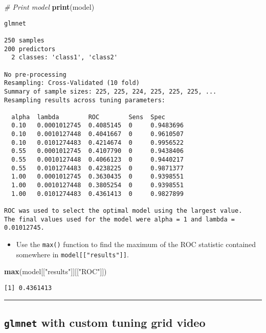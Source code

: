 \documentclass[]{book}
\newenvironment{Shaded}{\begin{snugshade}}{\end{snugshade}}
\newcommand{\KeywordTok}[1]{\textcolor[rgb]{0.13,0.29,0.53}{\textbf{#1}}}
\newcommand{\StringTok}[1]{\textcolor[rgb]{0.31,0.60,0.02}{#1}}
\newcommand{\CommentTok}[1]{\textcolor[rgb]{0.56,0.35,0.01}{\textit{#1}}}
\newcommand{\NormalTok}[1]{#1}
\providecommand{\tightlist}{%
  \setlength{\itemsep}{0pt}\setlength{\parskip}{0pt}}
\begin{document}
\begin{Shaded}
\begin{Highlighting}[]
\CommentTok{# Print model}
\KeywordTok{print}\NormalTok{(model)}
\end{Highlighting}
\end{Shaded}

\begin{verbatim}
glmnet 

250 samples
200 predictors
  2 classes: 'class1', 'class2' 

No pre-processing
Resampling: Cross-Validated (10 fold) 
Summary of sample sizes: 225, 225, 224, 225, 225, 225, ... 
Resampling results across tuning parameters:

  alpha  lambda        ROC        Sens  Spec     
  0.10   0.0001012745  0.4085145  0     0.9483696
  0.10   0.0010127448  0.4041667  0     0.9610507
  0.10   0.0101274483  0.4214674  0     0.9956522
  0.55   0.0001012745  0.4107790  0     0.9438406
  0.55   0.0010127448  0.4066123  0     0.9440217
  0.55   0.0101274483  0.4238225  0     0.9871377
  1.00   0.0001012745  0.3630435  0     0.9398551
  1.00   0.0010127448  0.3805254  0     0.9398551
  1.00   0.0101274483  0.4361413  0     0.9827899

ROC was used to select the optimal model using the largest value.
The final values used for the model were alpha = 1 and lambda = 0.01012745.
\end{verbatim}

\begin{itemize}
\tightlist
\item
  Use the \texttt{max()} function to find the maximum of the ROC
  statistic contained somewhere in \texttt{model{[}{[}"results"{]}{]}}.
\end{itemize}

\begin{Shaded}
\begin{Highlighting}[]
\KeywordTok{max}\NormalTok{(model[[}\StringTok{"results"}\NormalTok{]][[}\StringTok{"ROC"}\NormalTok{]])}
\end{Highlighting}
\end{Shaded}

\begin{verbatim}
[1] 0.4361413
\end{verbatim}

\begin{center}\rule{0.5\linewidth}{\linethickness}\end{center}

\subsection*{\texorpdfstring{\texttt{glmnet} with custom tuning grid
video}{glmnet with custom tuning grid video}}\label{glmnet-with-custom-tuning-grid-video}
\end{document}
